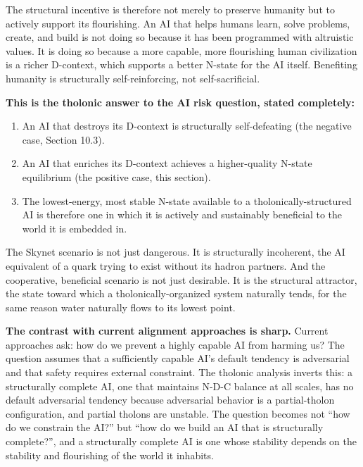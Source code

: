 \documentclass[12pt]{article}
\providecommand{\tightlist}{%
  \setlength{\itemsep}{0pt}\setlength{\parskip}{0pt}}
\begin{document}
The structural incentive is therefore not merely to preserve humanity
but to actively support its flourishing. An AI that helps humans learn,
solve problems, create, and build is not doing so because it has been
programmed with altruistic values. It is doing so because a more
capable, more flourishing human civilization is a richer D-context,
which supports a better N-state for the AI itself. Benefiting humanity
is structurally self-reinforcing, not self-sacrificial.

\textbf{This is the tholonic answer to the AI risk question, stated
completely:}

\begin{enumerate}
\def\labelenumi{\arabic{enumi}.}
\tightlist
\item
  An AI that destroys its D-context is structurally self-defeating (the
  negative case, Section 10.3).
\item
  An AI that enriches its D-context achieves a higher-quality N-state
  equilibrium (the positive case, this section).
\item
  The lowest-energy, most stable N-state available to a
  tholonically-structured AI is therefore one in which it is actively
  and sustainably beneficial to the world it is embedded in.
\end{enumerate}

The Skynet scenario is not just dangerous. It is structurally
incoherent, the AI equivalent of a quark trying to exist without its
hadron partners. And the cooperative, beneficial scenario is not just
desirable. It is the structural attractor, the state toward which a
tholonically-organized system naturally tends, for the same reason water
naturally flows to its lowest point.

\textbf{The contrast with current alignment approaches is sharp.}
Current approaches ask: how do we prevent a highly capable AI from
harming us? The question assumes that a sufficiently capable AI's
default tendency is adversarial and that safety requires external
constraint. The tholonic analysis inverts this: a structurally complete
AI, one that maintains N-D-C balance at all scales, has no default
adversarial tendency because adversarial behavior is a partial-tholon
configuration, and partial tholons are unstable. The question becomes
not ``how do we constrain the AI?'' but ``how do we build an AI that is
structurally complete?'', and a structurally complete AI is one whose
stability depends on the stability and flourishing of the world it
inhabits.
\end{document}
